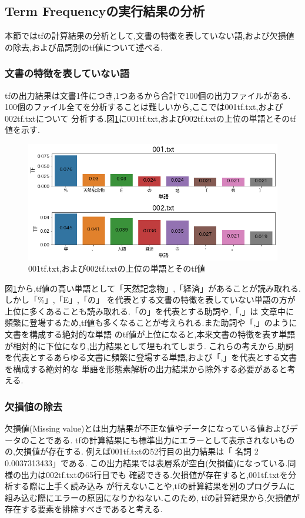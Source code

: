 \documentclass[a4j]{jarticle}
\begin{document}
\subsection{Term Frequencyの実行結果の分析}
本節ではtfの計算結果の分析として,文書の特徴を表していない語,および欠損値の除去,および品詞別のtf値について述べる.
\subsubsection{文書の特徴を表していない語}
tfの出力結果は文書1件につき,1つあるから合計で100個の出力ファイルがある.
100個のファイル全てを分析することは難しいから,ここでは001tf.txt,および002tf.txtについて
分析する.図\ref{tftop}に001tf.txt,および002tf.txtの上位の単語とそのtf値を示す.
\begin{figure}[H]
	\centering
	\includegraphics[scale=0.5]{tftop.png}
	\caption{001tf.txt,および002tf.txtの上位の単語とそのtf値}
   \label{tftop}
  \end{figure}

図\ref{tftop}から,tf値の高い単語として「天然記念物」,「経済」があることが読み取れる.しかし「\%」,「E」,「の」
を代表とする文書の特徴を表していない単語の方が上位に多くあることも読み取れる.「の」を代表とする助詞や,「,」は
文章中に頻繁に登場するため,tf値も多くなることが考えられる.また助詞や「,」のように文書を構成する絶対的な単語
のtf値が上位になると,本来文書の特徴を表す単語が相対的に下位になり,出力結果として埋もれてしまう.
これらの考えから,助詞を代表とするあらゆる文書に頻繁に登場する単語,および「,」を代表とする文書を構成する絶対的な
単語を形態素解析の出力結果から除外する必要があると考える.

\subsubsection{欠損値の除去}
欠損値(Missing value)とは出力結果が不正な値やデータになっている値およびデータのことである.
tfの計算結果にも標準出力にエラーとして表示されないものの,欠損値が存在する.
例えば001tf.txtの52行目の出力結果は「		名詞	2	0.0037313433」である.
この出力結果では表層系が空白(欠損値)になっている.同様の出力は002tf.txtの65行目でも
確認できる.欠損値が存在すると,001tf.txtを分析する際に上手く読み込み
が行えないことや,tfの計算結果を別のプログラムに組み込む際にエラーの原因になりかねない.このため,
tfの計算結果から,欠損値が存在する要素を排除すべきであると考える.
\end{document}
